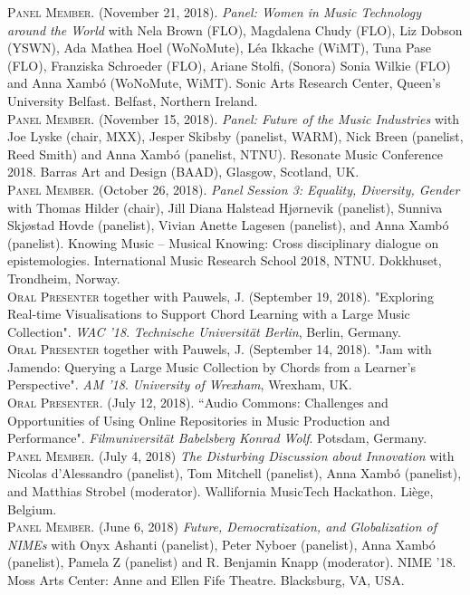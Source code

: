 \documentclass[10pt, a4paper]{article}
\newcommand{\years}[1]{\marginnote{\scriptsize #1}}
\begin{document}
\years{2018j}\textsc{Panel Member}. (November 21, 2018). \emph{Panel: Women in Music Technology around the World} with Nela Brown (FLO), Magdalena Chudy (FLO), Liz Dobson (YSWN), Ada Mathea Hoel (WoNoMute), Léa Ikkache (WiMT), Tuna Pase (FLO), Franziska Schroeder (FLO), Ariane Stolfi, (Sonora) Sonia Wilkie (FLO) and Anna Xambó (WoNoMute, WiMT). Sonic Arts Research Center, Queen's University Belfast. Belfast, Northern Ireland.\\
\years{2018i}\textsc{Panel Member}. (November 15, 2018). \emph{Panel: Future of the Music Industries} with Joe Lyske (chair, MXX), Jesper Skibsby (panelist, WARM), Nick Breen (panelist, Reed Smith) and Anna Xambó (panelist, NTNU). Resonate Music Conference 2018. Barras Art and Design (BAAD), Glasgow, Scotland, UK.\\
\years{2018h}\textsc{Panel Member}. (October 26, 2018). \emph{Panel Session 3: Equality, Diversity, Gender} with Thomas Hilder (chair), Jill Diana Halstead Hjørnevik (panelist), Sunniva Skjøstad Hovde (panelist), Vivian Anette Lagesen (panelist), and Anna Xambó (panelist). Knowing Music -- Musical Knowing: Cross disciplinary dialogue on epistemologies. International Music Research School 2018, NTNU. Dokkhuset, Trondheim, Norway.\\
\years{2018g} \textsc{Oral Presenter} together with Pauwels, J.  (September 19, 2018). "Exploring Real-time Visualisations to Support Chord Learning with a Large Music Collection". \emph{WAC '18}. \emph{Technische Universität Berlin}, Berlin, Germany.\\
\years{2018f} \textsc{Oral Presenter} together with Pauwels, J. (September 14, 2018). "Jam with Jamendo: Querying a Large Music Collection by Chords from a Learner’s Perspective". \emph{AM '18}. \emph{University of Wrexham}, Wrexham, UK.\\
\years{2018e} \textsc{Oral Presenter}. (July 12, 2018). “Audio Commons: Challenges and Opportunities of Using Online Repositories in Music Production and Performance". \emph{Filmuniversität Babelsberg Konrad Wolf}. Potsdam, Germany.\\
\years{2018d}\textsc{Panel Member}. (July 4, 2018) \emph{The Disturbing Discussion about Innovation} with Nicolas d'Alessandro (panelist), Tom Mitchell (panelist), Anna Xambó (panelist), and Matthias Strobel (moderator). Wallifornia MusicTech Hackathon. Liège, Belgium.\\
\years{2018c}\textsc{Panel Member}. (June 6, 2018) \emph{Future, Democratization, and Globalization of NIMEs} with Onyx Ashanti (panelist), Peter Nyboer (panelist), Anna Xambó (panelist), Pamela Z (panelist) and R. Benjamin Knapp (moderator). NIME '18. Moss Arts Center: Anne and Ellen Fife Theatre. Blacksburg, VA, USA.
\end{document}
